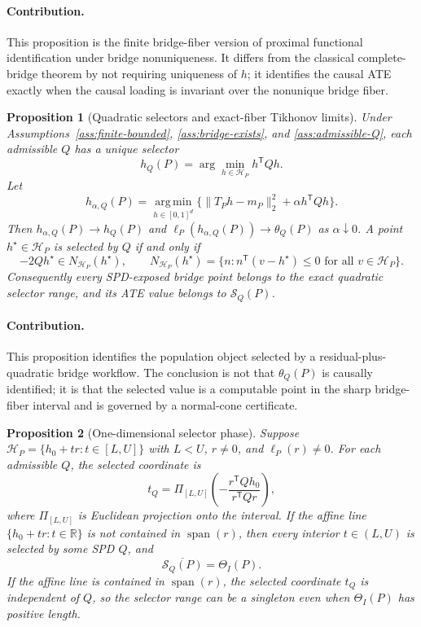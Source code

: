 \documentclass[11pt]{article}
\newcommand{\transpose}{\mathsf{T}}
\newcommand{\calH}{\mathcal{H}}
\newcommand{\R}{\mathbb{R}}
\theoremstyle{definition}
\theoremstyle{plain}
\newtheorem{proposition}{Proposition}
\theoremstyle{remark}
\begin{document}
\paragraph{Contribution.}
This proposition is the finite bridge-fiber version of proximal functional
identification under bridge nonuniqueness.  It differs from the classical
complete-bridge theorem by not requiring uniqueness of \(h\); it identifies
the causal ATE exactly when the causal loading is invariant over the
nonunique bridge fiber.

\begin{proposition}[Quadratic selectors and exact-fiber Tikhonov limits]\label{prop:selector-kkt}
Under Assumptions~\ref{ass:finite-bounded}, \ref{ass:bridge-exists}, and
\ref{ass:admissible-Q}, each admissible \(Q\) has a unique selector
\[
  h_Q(P)=\arg\min_{h\in\calH_P}h^\transpose Qh.
\]
Let
\[
  h_{\alpha,Q}(P)=\operatorname*{arg\,min}_{h\in[0,1]^d}
  \{\|T_Ph-m_P\|_2^2+\alpha h^\transpose Qh\}.
\]
Then \(h_{\alpha,Q}(P)\to h_Q(P)\) and
\(\ell_P(h_{\alpha,Q}(P))\to\theta_Q(P)\) as \(\alpha\downarrow0\).  A point
\(h^\star\in\calH_P\) is selected by \(Q\) if and only if
\[
  -2Qh^\star\in N_{\calH_P}(h^\star),
  \qquad
  N_{\calH_P}(h^\star)=\{n:n^\transpose(v-h^\star)\le0
  \text{ for all }v\in\calH_P\}.
\]
Consequently every SPD-exposed bridge point belongs to the exact quadratic
selector range, and its ATE value belongs to \(\mathcal S_Q(P)\).
\end{proposition}
\paragraph{Contribution.}
This proposition identifies the population object selected by a
residual-plus-quadratic bridge workflow.  The conclusion is not that
\(\theta_Q(P)\) is causally identified; it is that the selected value is a
computable point in the sharp bridge-fiber interval and is governed by a
normal-cone certificate.

\begin{proposition}[One-dimensional selector phase]\label{prop:onedim}
Suppose \(\calH_P=\{h_0+tr:t\in[L,U]\}\) with \(L<U\), \(r\neq0\), and
\(\ell_P(r)\neq0\).  For each admissible \(Q\), the selected coordinate is
\[
  t_Q
  =
  \Pi_{[L,U]}
  \left(-\frac{r^\transpose Qh_0}{r^\transpose Qr}\right),
\]
where \(\Pi_{[L,U]}\) is Euclidean projection onto the interval.  If the
affine line \(\{h_0+tr:t\in\R\}\) is not contained in \(\operatorname{span}(r)\),
then every interior \(t\in(L,U)\) is selected by some SPD \(Q\), and
\[
  \overline{\mathcal S_Q(P)}=\Theta_I(P).
\]
If the affine line is contained in \(\operatorname{span}(r)\), the selected
coordinate \(t_Q\) is independent of \(Q\), so the selector range can be a
singleton even when \(\Theta_I(P)\) has positive length.
\end{proposition}
\end{document}
